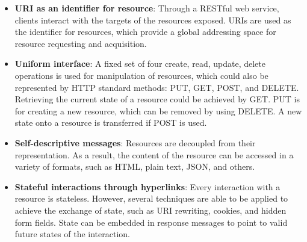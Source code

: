 \begin{itemize}
  \item \textbf{URI as an identifier for resource}:  Through a RESTful web service, clients interact with the targets of the resources exposed. URIs are used as the identifier for resources, which provide a global addressing space for resource requesting and acquisition. 

  \item \textbf{Uniform interface}:  A fixed set of four create, read, update, delete operations is used for manipulation of resources, which could also be represented by HTTP standard methods: PUT, GET, POST, and DELETE.  Retrieving the current state of a resource could be achieved by GET. PUT is for creating a new resource, which can be removed by using DELETE. A new state onto a resource is transferred if POST is used.

  \item \textbf{Self-descriptive messages}:  Resources are decoupled from their representation. As a result, the content of the resource can be accessed in a variety of formats, such as HTML, plain text, JSON, and others.

  \item \textbf{Stateful interactions through hyperlinks}:  Every interaction with a resource is stateless. However, several techniques are able to be applied to achieve the exchange of state, such as URI rewriting, cookies, and hidden form fields. State can be embedded in response messages to point to valid future states of the interaction\cite{richardson2008restful}. 


\end{itemize}






